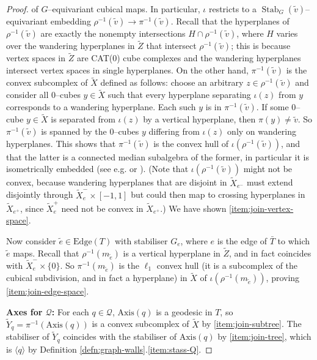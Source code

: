 \documentclass[11pt,oneside]{amsart}
\newcounter{ax}
\theoremstyle{definition}
\DeclareMathOperator{\stabilizer}{Stab}
\newcommand{\edges}{\mathrm{Edge}}
\newcommand{\axis}{\mathrm{Axis}}
\begin{document}
\begin{proof}
of $G$--equivariant cubical maps.  In particular, $\iota$ restricts to a $\stabilizer_G(\tilde v)$--equivariant embedding $\rho^{-1}(\tilde v)\to\pi^{-1}(\tilde v)$.  Recall that the hyperplanes of $\rho^{-1}(\tilde v)$ are exactly the nonempty intersections $H\cap \rho^{-1}(\tilde v)$, where $H$ varies over the wandering hyperplanes in $\widetilde Z$ that intersect $\rho^{-1}(\tilde v)$; this is because vertex spaces in $\widetilde Z$ are CAT(0) cube complexes and the wandering hyperplanes intersect vertex spaces in single hyperplanes.  On the other hand, $\pi^{-1}(\tilde v)$ is the convex subcomplex of $\widetilde X$ defined as follows: choose an arbitrary $z\in\rho^{-1}(\tilde v)$ and consider all $0$--cubes $y\in\widetilde X$ such that every hyperplane separating $\iota(z)$ from $y$ corresponds to a wandering hyperplane.  Each such $y$ is in $\pi^{-1}(\tilde v)$.  If some $0$--cube $y\in\widetilde X$ is separated from $\iota(z)$ by a vertical hyperplane, then $\pi(y)\neq \tilde v$.  So $\pi^{-1}(\tilde v)$ is spanned by the $0$--cubes $y$ differing from $\iota(z)$ only on wandering hyperplanes.  This shows that $\pi^{-1}(\tilde v)$ is the convex hull of $\iota(\rho^{-1}(\tilde v))$, and that the latter is a connected median subalgebra of the former, in particular it is isometrically embedded (see e.g. \cite[Sec. 2]{Bowditch} or \cite[Lem. 2.11]{HagenPetyt}).  (Note that $\iota(\rho^{-1}(\tilde v))$ might not be convex, because wandering hyperplanes that are disjoint in $\widetilde X_{e^-}$ must extend disjointly through $\widetilde X_e^-\times[-1,1]$ but could then map to crossing hyperplanes in $\widetilde X_{e^+}$, since $\widetilde X_{e}^+$ need not be convex in $\widetilde X_{e^+}$.)  We have shown \eqref{item:join-vertex-space}.

Now consider $\tilde e\in\edges(T)$ with stabiliser $G_e$, where $e$ is the edge of $\bar T$ to which $\tilde e$ maps.  Recall that $\rho^{-1}(m_{\tilde e})$ is a vertical hyperplane in $\widetilde Z$, and in fact coincides with $\widetilde X_e^-\times\{0\}$.  So $\pi^{-1}(m_{\tilde e})$ is the $\ell_1$ convex hull (it is a subcomplex of the cubical subdivision, and in fact a hyperplane) in $\widetilde X$ of $\iota(\rho^{-1}(m_{\tilde e}))$, proving \eqref{item:join-edge-space}.

\textbf{Axes for $\mathcal Q$:}  For each $q\in\mathcal Q$, $\axis(q)$ is a geodesic in $T$, so $\widetilde Y_q=\pi^{-1}(\axis(q))$ is a convex subcomplex of $\widetilde X$ by \eqref{item:join-subtree}.  The stabiliser of $\widetilde Y_q$ coincides with the stabiliser of $\axis(q)$ by \eqref{item:join-tree}, which is $\langle q\rangle$ by Definition \ref{defn:graph-walls}.\eqref{item:stass-Q}. 
\end{proof}
\end{document}
